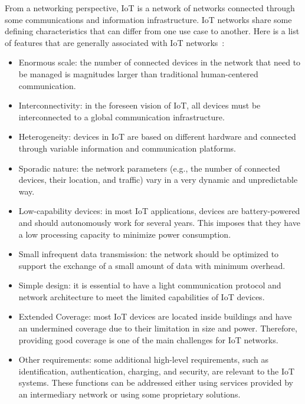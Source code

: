 \documentclass[]{IEEEtran}
\begin{document}
From a networking perspective, IoT is a network of networks connected through some communications and information infrastructure.
IoT networks share some defining characteristics that can differ from one use case to another.
Here is a list of features that are generally associated with IoT networks~\cite{itu-t_overview_2012_Y.2060,3gpp_service_nodate_22.368}:
\begin{itemize}
    \item Enormous scale: the number of connected devices in the network that need to be managed is magnitudes larger than traditional human-centered communication.
    \item Interconnectivity: in the foreseen vision of IoT, all devices must be interconnected to a global communication infrastructure.
    \item Heterogeneity: devices in IoT are based on different hardware and connected through variable information and communication platforms.
    \item Sporadic nature: the network parameters (e.g., the number of connected devices, their location, and traffic) vary in a very dynamic and unpredictable way.
    \item Low-capability devices: in most IoT applications, devices are battery-powered and should autonomously work for several years.
    This imposes that they have a low processing capacity to minimize power consumption.
    \item Small infrequent data transmission: the network should be optimized to support the exchange of a small amount of data with minimum overhead.
    \item Simple design: it is essential to have a light communication protocol and network architecture to meet the limited capabilities of IoT devices.
    \item Extended Coverage: most IoT devices are located inside buildings and have an undermined coverage due to their limitation in size and power. Therefore, providing good coverage is one of the main challenges for IoT networks.
    \item Other requirements: some additional high-level requirements, such as identification, authentication, charging, and security, are relevant to the IoT systems.
    These functions can be addressed either using services provided by an intermediary network or using some proprietary solutions.
\end{itemize}
\end{document}

